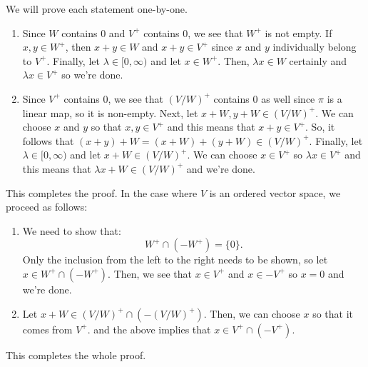 %
%
\label {sol: subspaces and quotients of preordered vector spaces are preordered}We will prove each statement one-by-one.
\begin{enumerate}
    \item Since $W$ contains $0$ and $V^+$ contains $0$, we see that $W^+$ is not empty. If $x,y \in W^+$, then $x+y \in W$ and $x+y \in V^+$ since $x$ and $y$ individually belong to $V^+$. Finally, let $\lambda \in [0,\infty)$ and let $x \in W^+$. Then, $\lambda x \in W$ certainly and $\lambda x \in V^+$ so we're done.
    \item Since $V^+$ contains $0$, we see that $(V/W)^+$ contains $0$ as well since $\pi$ is a linear map, so it is non-empty. Next, let $x+W,y+W \in (V/W)^+$. We can choose $x$ and $y$ so that $x,y \in V^+$ and this means that $x+y \in V^+$. So, it follows that $(x+y)+W = (x+W) + (y+W) \in (V/W)^+$. Finally, let $\lambda \in [0,\infty)$ and let $x+W \in (V/W)^+$. We can choose $x \in V^+$ so $\lambda x \in V^+$ and this means that $\lambda x+W \in (V/W)^+$ and we're done.
\end{enumerate}
This completes the proof. In the case where $V$ is an ordered vector space, we proceed as follows:
\begin{enumerate}
    \item We need to show that:
    \[W^+ \cap (-W^+) = \{0\}.\]
    Only the inclusion from the left to the right needs to be shown, so let $x \in W^+ \cap (-W^+)$. Then, we see that $x \in V^+$ and $x \in -V^+$ so $x = 0$ and we're done.
    \item Let $x+W \in (V/W)^+ \cap (-(V/W)^+)$. Then, we can choose $x$ so that it comes from $V^+$. and the above implies that $x \in V^+ \cap (-V^+)$.
\end{enumerate}
This completes the whole proof.
